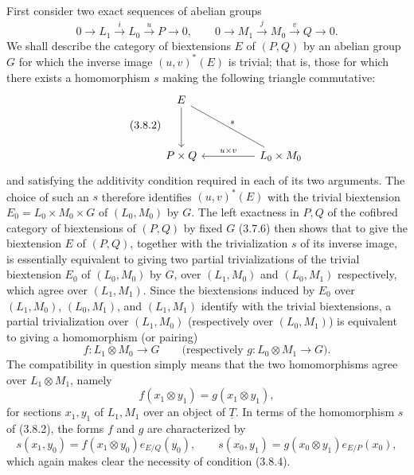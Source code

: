 First consider two exact sequences of abelian groups
\begin{equation}\tag{3.8.1}
 0\longrightarrow L_1\xrightarrow{\ i\ }L_0\xrightarrow{\ u\ }P
 \longrightarrow0,\qquad
 0\longrightarrow M_1\xrightarrow{\ j\ }M_0\xrightarrow{\ v\ }Q
 \longrightarrow0.
\end{equation}
We shall describe the category of biextensions $E$ of $(P,Q)$ by an
abelian group $G$ for which the inverse image $(u,v)^*(E)$ is trivial;
that is, those for which there exists a homomorphism $s$ making the
following triangle commutative:
\begin{equation}\tag{3.8.2}
\begin{tikzcd}[column sep=huge,row sep=huge]
 E\arrow[d]\arrow[dr,dash,"s"]&\\
 P\times Q&L_0\times M_0\arrow[l,"u\times v"']
\end{tikzcd}
\end{equation}
and satisfying the additivity condition required in each of its two
arguments.  The choice of such an $s$ therefore identifies
$(u,v)^*(E)$ with the trivial biextension
$E_0=L_0\times M_0\times G$ of $(L_0,M_0)$ by $G$.  The left
exactness in $P,Q$ of the cofibred category of biextensions of
$(P,Q)$ by fixed $G$ (3.7.6) then shows that to give the biextension
$E$ of $(P,Q)$, together with the trivialization $s$ of its inverse
image, is essentially equivalent to giving two partial
trivializations of the trivial biextension $E_0$ of $(L_0,M_0)$ by
$G$, over $(L_1,M_0)$ and $(L_0,M_1)$ respectively, which agree over
$(L_1,M_1)$.  Since the biextensions induced by $E_0$ over
$(L_1,M_0)$, $(L_0,M_1)$, and $(L_1,M_1)$ identify with the trivial
biextensions, a partial trivialization over $(L_1,M_0)$ (respectively
over $(L_0,M_1)$) is equivalent to giving a homomorphism (or pairing)
\begin{equation}\tag{3.8.3}
 f:L_1\otimes M_0\longrightarrow G
 \qquad
 \bigl(\text{respectively }g:L_0\otimes M_1\longrightarrow G\bigr).
\end{equation}
The compatibility in question simply means that the two
homomorphisms agree over $L_1\otimes M_1$, namely
\begin{equation}\tag{3.8.4}
 f(x_1\otimes y_1)=g(x_1\otimes y_1),
\end{equation}
for sections $x_1,y_1$ of $L_1,M_1$ over an object of
$\underline T$.  In terms of the homomorphism $s$ of (3.8.2), the
forms $f$ and $g$ are characterized by
\begin{equation}\tag{3.8.5}
 s(x_1,y_0)=f(x_1\otimes y_0)e_{E/Q}(y_0),\qquad
 s(x_0,y_1)=g(x_0\otimes y_1)e_{E/P}(x_0),
\end{equation}
which again makes clear the necessity of condition (3.8.4).

